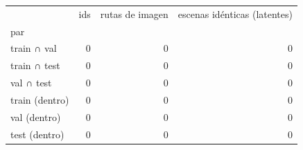 \begin{tabular}{lrrr}
\toprule
 & ids & rutas de imagen & escenas idénticas (latentes) \\
par &  &  &  \\
\midrule
train ∩ val & 0 & 0 & 0 \\
train ∩ test & 0 & 0 & 0 \\
val ∩ test & 0 & 0 & 0 \\
train (dentro) & 0 & 0 & 0 \\
val (dentro) & 0 & 0 & 0 \\
test (dentro) & 0 & 0 & 0 \\
\bottomrule
\end{tabular}
